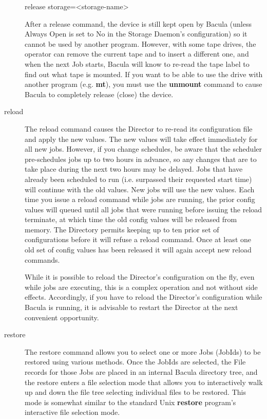 \begin{description}
release storage={\textless}storage-name{\textgreater}

   After a release command, the device is still kept open by Bacula (unless
   Always Open is set to No in the Storage Daemon's configuration) so it
   cannot be used by another program.  However, with some tape drives, the
   operator can remove the current tape and to insert a different one, and
   when the next Job starts, Bacula will know to re-read the tape label to
   find out what tape is mounted.  If you want to be able to use the drive
   with another program (e.g.  {\bf mt}), you must use the {\bf unmount}
   command to cause Bacula to completely release (close) the device.

\item [reload]
  The reload command causes the Director to re-read its configuration
  file and apply the new values. The new values will take effect
  immediately for all new jobs.  However, if you change schedules,
  be aware that the scheduler pre-schedules jobs up to two hours in
  advance, so any changes that are to take place during the next two
  hours may be delayed.  Jobs that have already been scheduled to run
  (i.e. surpassed their requested start time) will continue with the
  old values.  New jobs will use the new values. Each time you issue
  a reload command while jobs are running, the prior config values
  will queued until all jobs that were running before issuing
  the reload terminate, at which time the old config values will
  be released from memory. The Directory permits keeping up to
  ten prior set of configurations before it will refuse a reload
  command. Once at least one old set of config values has been
  released it will again accept new reload commands.

   While it is possible to reload the Director's configuration on the fly,
   even while jobs are executing, this is a complex operation and not
   without side effects.  Accordingly, if you have to reload the Director's
   configuration while Bacula is running, it is advisable to restart the
   Director at the next convenient opportunity.

\label{restore_command}
\item [restore]
   The restore command allows you to select one or more Jobs (JobIds) to be
   restored using various methods.  Once the JobIds are selected, the File
   records for those Jobs are placed in an internal Bacula directory tree,
   and the restore enters a file selection mode that allows you to
   interactively walk up and down the file tree selecting individual files
   to be restored.  This mode is somewhat similar to the standard Unix {\bf
   restore} program's interactive file selection mode.


\end{description}
